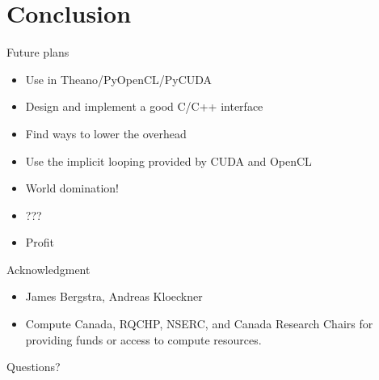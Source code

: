 \documentclass[utf8x,xcolor=pdftex,dvipsnames,table]{beamer}
\begin{document}
\section{Conclusion}
\begin{frame}{Future plans}
\begin{itemize}
\item<1-> Use in Theano/PyOpenCL/PyCUDA
\item<2-> Design and implement a good C/C++ interface
\item<3-> Find ways to lower the overhead
\item<4-> Use the implicit looping provided by CUDA and OpenCL
\item<5-> World domination!
\item<5-> ???
\item<5-> Profit
\end{itemize}
\end{frame}

\begin{frame}{Acknowledgment}
\begin{itemize}
\item James Bergstra, Andreas Kloeckner
\item Compute Canada, RQCHP, NSERC, and Canada Research Chairs for providing funds or access to compute resources.
\end{itemize}
\end{frame}

\begin{frame}
\begin{center}
\Huge
Questions?
\end{center}
\end{frame}
\end{document}
